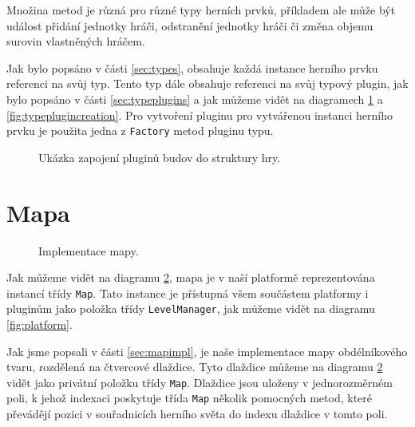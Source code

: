 Množina metod je různá pro různé typy herních prvků, příkladem ale může být událost přidání jednotky hráči, odstranění jednotky hráči či změna objemu surovin vlastněných hráčem.

Jak bylo popsáno v části \ref{sec:types}, obsahuje každá instance herního prvku referenci na svůj typ. Tento typ dále obsahuje referenci na svůj typový plugin, jak bylo popsáno v části \ref{sec:typeplugins} a jak můžeme vidět na diagramech \ref{fig:pluginstructure} a \ref{fig:typeplugincreation}. Pro vytvoření pluginu pro vytvářenou instanci herního prvku je použita jedna z \texttt{Factory} metod pluginu typu. 

\begin{figure}[h]
	\centering
	\fontsize{8pt}{11pt}\selectfont
	\def\svgwidth{\textwidth}
	
	\caption{Ukázka zapojení pluginů budov do struktury hry.}
	\label{fig:pluginstructure}
\end{figure}

\section{Mapa}
\label{sec:mapimpldoc}

\begin{figure}[h]
	\centering
	\fontsize{8pt}{11pt}\selectfont
	\def\svgwidth{\textwidth}
	
	\caption{Implementace mapy.}
	\label{fig:mapimpl}
\end{figure}

Jak můžeme vidět na diagramu \ref{fig:mapimpl}, mapa je v naší platformě reprezentována instancí třídy \texttt{Map}. Tato instance je přístupná všem součástem platformy i pluginům jako položka třídy \texttt{LevelManager}, jak můžeme vidět na diagramu \ref{fig:platform}. 

Jak jsme popsali v části \ref{sec:mapimpl}, je naše implementace mapy obdélníkového tvaru, rozdělená na čtvercové dlaždice. Tyto dlaždice můžeme na diagramu \ref{fig:mapimpl} vidět jako privátní položku třídy \texttt{Map}. Dlaždice jsou uloženy v jednorozměrném poli, k jehož indexaci poskytuje třída \texttt{Map} několik pomocných metod, které převádějí pozici v souřadnicích herního světa do indexu dlaždice v tomto poli. 


